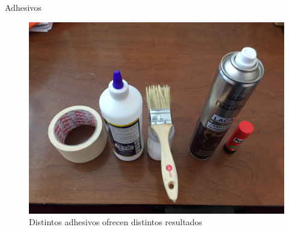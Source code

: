 \documentclass{beamer}
\begin{document}
	\begin{frame}{Adhesivos}
		\begin{figure}
			\includegraphics[width=.75\textwidth]{images/adhesivos}
			\caption{Distintos adhesivos ofrecen distintos resultados}
		\end{figure}
	\end{frame}
	
\end{document}
